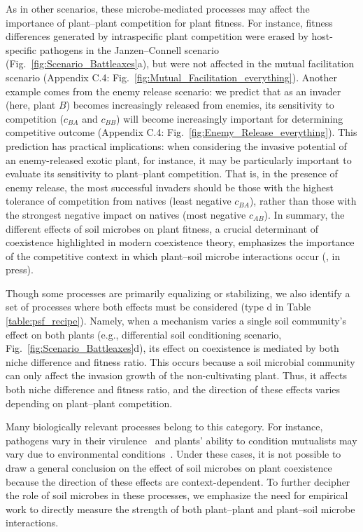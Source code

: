 As in other scenarios, these microbe-mediated processes may affect the importance of plant--plant competition for plant fitness. For instance, fitness differences generated by intraspecific plant competition were erased by host-specific pathogens in the Janzen--Connell scenario (Fig.~\ref{fig:Scenario_Battleaxes}a), but were not affected in the mutual facilitation scenario (Appendix C.4: Fig.~\ref{fig:Mutual_Facilitation_everything}).
Another example comes from the enemy release scenario: we predict that as an invader (here, plant $B$) becomes increasingly released from enemies, its sensitivity to competition ($c_{BA}$ and $c_{BB}$) will become increasingly important for determining competitive outcome (Appendix C.4: Fig.~\ref{fig:Enemy_Release_everything}).
This prediction has practical implications: when considering the invasive potential of an enemy-released exotic plant, for instance, it may be particularly important to evaluate its sensitivity to plant--plant competition. That is, in the presence of enemy release, the most successful invaders should be those with the highest tolerance of competition from natives (least negative $c_{BA}$), rather than those with the strongest negative impact on natives (most negative $c_{AB}$).
In summary, the different effects of soil microbes on plant fitness, a crucial determinant of coexistence highlighted in modern coexistence theory, emphasizes the importance of the competitive context in which plant--soil microbe interactions occur (\citeauthor{Kandlikar2019}, in press).
\par


Though some processes are primarily equalizing or stabilizing, we also identify a set of processes where both effects must be considered (type d in Table \ref{table:psf_recipe}). Namely, when a mechanism varies a single soil community's effect on both plants (e.g., differential soil conditioning scenario, Fig.~\ref{fig:Scenario_Battleaxes}d), its effect on coexistence is mediated by both niche difference and fitness ratio. This occurs because a soil microbial community can only affect the invasion growth of the non-cultivating plant. Thus, it affects both niche difference and fitness ratio, and the direction of these effects varies depending on plant--plant competition.
\par


Many biologically relevant processes belong to this category. For instance, pathogens vary in their virulence~\citep{Reinhart2010} and plants' ability to condition mutualists may vary due to environmental conditions~\citep{Zheng2015, Norby1987}. Under these cases, it is not possible to draw a general conclusion on the effect of soil microbes on plant coexistence because the direction of these effects are context-dependent. To further decipher the role of soil microbes in these processes, we emphasize the need for empirical work to directly measure the strength of both plant--plant and plant--soil microbe interactions.
\par



